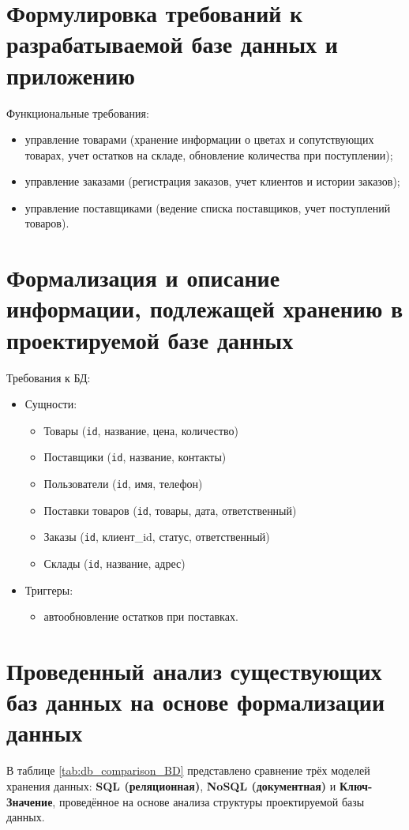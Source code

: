 \section{Формулировка требований к разрабатываемой базе данных и приложению}
Функциональные требования:
\begin{itemize}
	\item управление товарами (хранение информации о цветах и сопутствующих товарах, учет остатков на складе, обновление количества при поступлении);
	\item управление заказами (регистрация заказов, учет клиентов и истории заказов);
	\item управление поставщиками (ведение списка поставщиков, учет поступлений товаров).
\end{itemize}

\section{Формализация и описание информации, подлежащей хранению в проектируемой базе данных}
Требования к БД:
\begin{itemize}
	\item Сущности:
	\begin{itemize}
		\item Товары (\texttt{id}, название, цена, количество)
		\item Поставщики (\texttt{id}, название, контакты)
		\item Пользователи (\texttt{id}, имя, телефон)
		\item Поставки товаров (\texttt{id}, товары, дата, ответственный)
		\item Заказы (\texttt{id}, клиент\_id, статус, ответственный)
		\item Склады (\texttt{id}, название, адрес)
	\end{itemize}
	
	\item Триггеры:
	\begin{itemize}
		\item автообновление остатков при поставках.
	\end{itemize}
\end{itemize}

\section{Проведенный анализ существующих баз данных на основе формализации данных}
В таблице \ref{tab:db_comparison_BD} представлено сравнение трёх моделей хранения данных: \textbf{SQL (реляционная)}, \textbf{NoSQL (документная)} и \textbf{Ключ-Значение}, проведённое на основе анализа структуры проектируемой базы данных.
\clearpage

